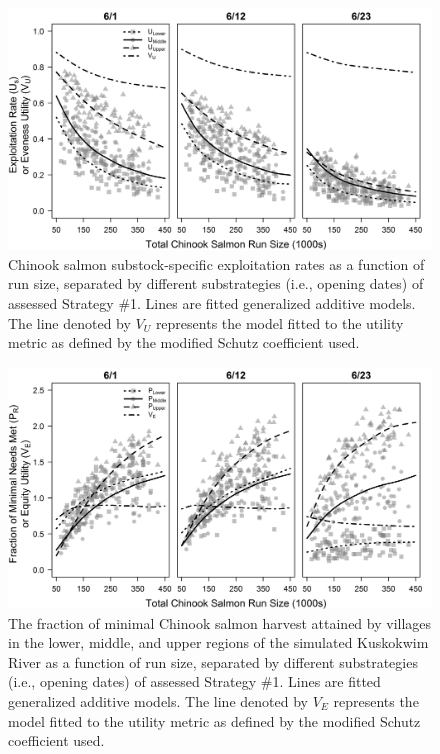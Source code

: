 \documentclass[12pt,]{book}
\theoremstyle{definition}
\theoremstyle{definition}
\theoremstyle{definition}
\theoremstyle{remark}
\begin{document}
\begin{singlespace}
\clearpage
\begin{figure}
  \centering
  \includegraphics{img/Ch3/U-v-N.jpg}
  \caption{Chinook salmon substock-specific exploitation rates as a function of run size, separated by different substrategies (i.e., opening dates) of assessed Strategy \#1. Lines are fitted generalized additive models. The line denoted by $V_U$ represents the model fitted to the utility metric as defined by the modified Schutz coefficient used.}
  \label{fig:U-v-N}
\end{figure}

\clearpage
\begin{figure}
  \centering
  \includegraphics{img/Ch3/pNeed-v-N.jpg}
  \caption{The fraction of minimal Chinook salmon harvest attained by villages in the lower, middle, and upper regions of the simulated Kuskokwim River as a function of run size, separated by different substrategies (i.e., opening dates) of assessed Strategy \#1. Lines are fitted generalized additive models. The line denoted by $V_E$ represents the model fitted to the utility metric as defined by the modified Schutz coefficient used.}
  \label{fig:pNeed-v-N}
\end{figure}


\end{singlespace}
\end{document}
